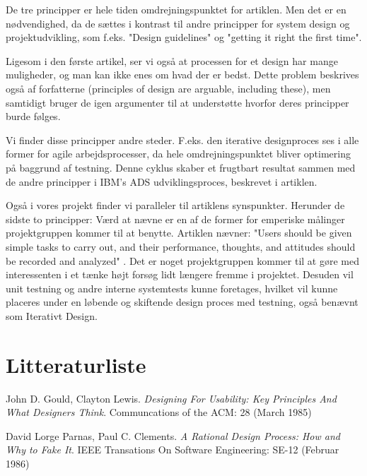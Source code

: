 \documentclass[a4paper,12pt]{article}
\begin{document}
De tre principper er hele tiden omdrejningspunktet for artiklen. Men det er en nødvendighed, da de sættes i kontrast til andre principper for system design og projektudvikling, som f.eks. "Design guidelines" og "getting it right the first time". \cite[side~304]{dfu}

Ligesom i den første artikel, ser vi også at processen for et design har mange muligheder, og man kan ikke enes om hvad der er bedst. Dette problem beskrives også af forfatterne (principles of design are arguable, including these)\cite[side~303]{dfu}, men samtidigt bruger de igen argumenter til at understøtte hvorfor deres principper burde følges.

Vi finder disse principper andre steder. F.eks. den iterative designproces ses i alle former for agile arbejdsprocesser, da hele omdrejningspunktet bliver optimering på baggrund af testning. Denne cyklus skaber et frugtbart resultat sammen med de andre principper i IBM's ADS udviklingsproces, beskrevet i artiklen.\cite[side~309]{dfu}

Også i vores projekt finder vi paralleler til artiklens synspunkter. Herunder de sidste to principper:
Værd at nævne er en af de former for emperiske målinger projektgruppen kommer til at benytte. Artiklen nævner: "Users should be given simple tasks to carry out, and their performance, thoughts, and attitudes should be recorded and analyzed" \cite[side~302]{dfu}. Det er noget projektgruppen kommer til at gøre med interessenten i et tænke højt forsøg lidt længere fremme i projektet.
Desuden vil unit testning og andre interne systemtests kunne foretages, hvilket vil kunne placeres under en løbende og skiftende design proces med testning, også benævnt som Iterativt Design.

\newpage
\section{Litteraturliste}

\begin{thebibliography}{9}

	John D. Gould, Clayton Lewis.
	\emph{Designing For Usability: Key Principles And What Designers Think}.
	Communcations of the ACM: 28 (March 1985)
	
	David Lorge Parnas, Paul C. Clements.
	\emph{A Rational Design Process: How and Why to Fake It}.
	IEEE Transations On Software Engineering: SE-12 (Februar 1986)
\end{thebibliography}
\end{document}
